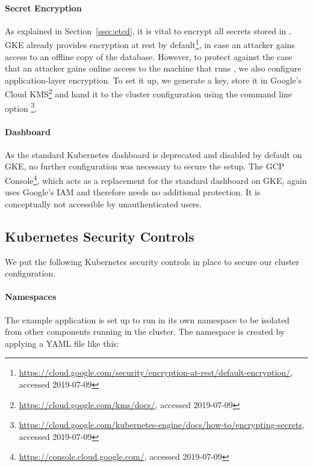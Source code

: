 \paragraph{Secret Encryption}

As explained in Section~\ref{ssec:etcd}, it is vital to encrypt all secrets stored in . \ac{GKE} already provides encryption at rest by default\footnote{\url{https://cloud.google.com/security/encryption-at-rest/default-encryption/}, accessed 2019-07-09}, in case an attacker gains access to an offline copy of the  database. However, to protect against the case that an attacker gains online access to the machine that runs , we also configure application-layer encryption. To set it up, we generate a key, store it in Google's Cloud \ac{KMS}\footnote{\url{https://cloud.google.com/kms/docs/}, accessed 2019-07-09} and hand it to the cluster configuration using the command line option \footnote{\url{https://cloud.google.com/kubernetes-engine/docs/how-to/encrypting-secrets}, accessed 2019-07-09}.  

\paragraph{Dashboard}

As the standard Kubernetes dashboard is deprecated and disabled by default on \ac{GKE}, no further configuration was necessary to secure the setup. The \ac{GCP} Console\footnote{\url{https://console.cloud.google.com/}, accessed 2019-07-09}, which acts as a replacement for the standard dashboard on \ac{GKE}, again uses Google's \ac{IAM} and therefore needs no additional protection. It is conceptually not accessible by unauthenticated users. 

\subsection{Kubernetes Security Controls} \label{ssec:exaLayer3}

We put the following Kubernetes security controls in place to secure our cluster configuration.

\paragraph{Namespaces}

The example application is set up to run in its own namespace  to be isolated from other components running in the cluster. The namespace is created by applying a YAML file like this:

